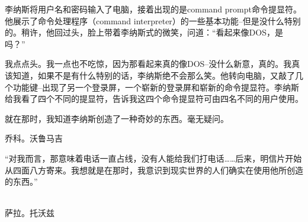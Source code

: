 李纳斯将用户名和密码输入了电脑，接着出现的是command prompt命令提显符。他展示了命令处理程序（command interpreter）的一些基本功能--但是没什么特别的。稍许，他回过头，脸上带着李纳斯式的微笑，问道：“看起来像DOS，是吗？”

我点点头。我一点也不吃惊，因为那看起来真的像DOS--没什么新意，真的。我真该知道，如果不是有什么特别的话，李纳斯绝不会那么笑。他转向电脑，又敲了几个功能键--出现了另一个登录屏，一个崭新的登录屏和崭新的命令提显符。李纳斯给我看了四个不同的提显符，告诉我这四个命令提显符可由四名不同的用户使用。

就在那时，我知道李纳斯创造了一种奇妙的东西。毫无疑问。

乔科。沃鲁马吉

 

“对我而言，那意味着电话一直占线，没有人能给我们打电话……后来，明信片开始从四面八方寄来。我想就是在那时，我意识到现实世界的人们确实在使用他所创造的东西。”

　　　　　　　　　　　　　　　　　　　　　　　　　　　　　　　　　　　　　萨拉。托沃兹

